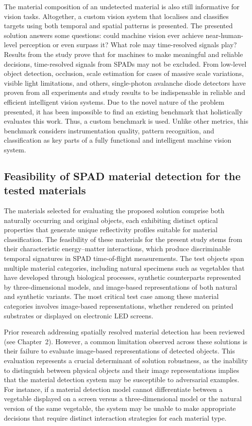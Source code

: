 \documentclass[12pt,a4paper,oneside]{report}
\begin{document}
The material composition of an undetected material is also still informative for vision tasks. Altogether, a custom vision system that localises and classifies targets using both temporal and spatial patterns is presented. The presented solution answers some questions: could machine vision ever achieve near-human-level perception or even surpass it? What role may time-resolved signals play? Results from the study prove that for machines to make meaningful and reliable decisions, time-resolved signals from SPADs may not be excluded. From low-level object detection, occlusion, scale estimation for cases of massive scale variations, visible light limitations, and others, single-photon avalanche diode detectors have proven from all experiments and study results to be indispensable in reliable and efficient intelligent vision systems. Due to the novel nature of the problem presented, it has been impossible to find an existing benchmark that holistically evaluates this work. Thus, a custom benchmark is used. Unlike other metrics, this benchmark considers instrumentation quality, pattern recognition, and classification as key parts of a fully functional and intelligent machine vision system.


\subsection{Feasibility of SPAD material detection for the tested materials}
\label{subsec:feasibility_spad_material_detection}

The materials selected for evaluating the proposed solution comprise both naturally occurring and original objects, each exhibiting distinct optical properties that generate unique reflectivity profiles suitable for material classification. The feasibility of these materials for the present study stems from their characteristic energy--matter interactions, which produce discriminable temporal signatures in SPAD time-of-flight measurements. The test objects span multiple material categories, including natural specimens such as vegetables that have developed through biological processes, synthetic counterparts represented by three-dimensional models, and image-based representations of both natural and synthetic variants. The most critical test case among these material categories involves image-based representations, whether rendered on printed substrates or displayed on electronic LED screens.

Prior research addressing spatially resolved material detection has been reviewed (see Chapter~2). However, a common limitation observed across these solutions is their failure to evaluate image-based representations of detected objects. This evaluation represents a crucial determinant of solution robustness, as the inability to distinguish between physical objects and their image representations implies that the material detection system may be susceptible to adversarial examples. For instance, if a material detection model cannot differentiate between a vegetable displayed on a screen versus a three-dimensional model or the natural version of the same vegetable, the system may be unable to make appropriate decisions that require distinct interaction strategies for each material type.
\end{document}
